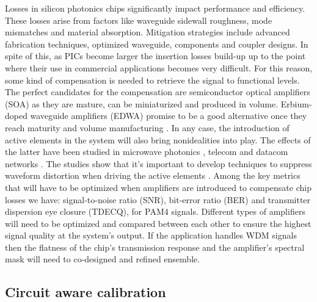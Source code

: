 Losses in silicon photonics chips significantly impact performance and efficiency.
These losses arise from factors like waveguide sidewall roughness, mode mismatches and material absorption.
Mitigation strategies include advanced fabrication techniques, optimized waveguide, components and coupler designs.
In spite of this, as PICs become larger the insertion losses build-up up to the point where their use in commercial applications becomes very difficult.
For this reason, some kind of compensation is needed to retrieve the signal to functional levels.
The perfect candidates for the compensation are semiconductor optical amplifiers (SOA) as they are mature, can be miniaturized and produced in volume.
Erbium-doped waveguide amplifiers (EDWA) promise to be a good alternative once they reach maturity and volume manufacturing \cite{noauthor_edwatec_nodate,liu_photonic_2022}.
In any case, the introduction of active elements in the system will also bring nonidealities into play.
The effects of the latter have been studied in microwave photonics \cite{sanchez_modeling_2021}, telecom \cite{bonk_soa_2018} and datacom networks \cite{o_duill_estimation_2017, way_technical_2014,maharry_integrated_2023}.
The studies show that it's important to develop techniques to suppress waveform distortion when driving the active elements \cite{masumoto_approach_2022}.
Among the key metrics that will have to be optimized when amplifiers are introduced to compensate chip losses we have: signal-to-noise ratio (SNR), bit-error ratio (BER) and transmitter dispersion eye closure (TDECQ), for PAM4 signals.
Different types of amplifiers will need to be optimized and compared between each other to ensure the highest signal quality \cite{st-arnault_performance_2024} at the system's output.
If the application handles WDM signals then the flatness of the chip's transmission response and the amplifier's spectral mask will need to co-designed and refined ensemble.

\subsection{Circuit aware calibration}\label{sub:circuit_aware_calibration} %

